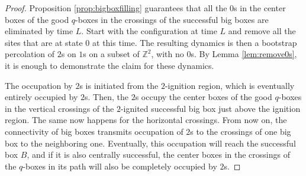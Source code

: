 \documentclass{article}
\newcommand{\bZ}{{\mathbb Z}}
\numberwithin{equation}{section}
\newtheorem{lemma}[theorem]{Lemma}
\newcommand{\note}[1]{{\bf \textcolor{blue}
{[#1\marginpar{\textcolor{red}{***}}]}}}
\begin{document}
\begin{proof}
Proposition \ref{prop:bigboxfilling} guarantees that all the $0$s in the center boxes of the good $q$-boxes in the crossings of the successful big boxes are eliminated by time $L$. Start with the configuration at time $L$ and remove all the sites that are at state $0$ at this time. 
    The resulting dynamics is then a 
    bootstrap percolation of $2$s on $1$s 
    on a subset of $\bZ^2$, with no $0$s. By Lemma \ref{lem:remove0s}, 
    it is enough to demonstrate the claim for these dynamics.
    

    The occupation by $2$s is initiated 
    from the $2$-ignition region, which is eventually 
    entirely occupied by $2$s. Then, the $2$s occupy the center boxes of the good $q$-boxes in the vertical crossings of the $2$-ignited successful big box just above the ignition region. The same now 
    happens for the horizontal crossings. From now on, the connectivity 
    of big boxes transmits occupation of $2$s to the crossings of one 
    big box to the neighboring one. Eventually, this occupation will 
    reach the successful box $B$, and if it is also centrally 
    successful, the center boxes in the crossings of the $q$-boxes in its path will also be completely occupied by $2$s.   
\end{proof}

\end{document}
